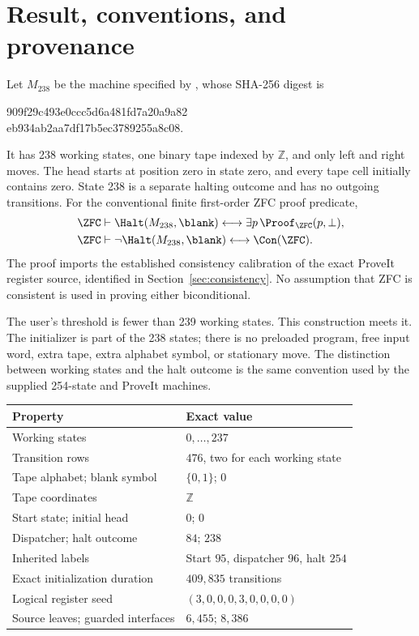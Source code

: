 \section{Result, conventions, and provenance}
\label{sec:result}

\begin{theorem}
\label{thm:main}
Let $M_{238}$ be the machine specified by
, whose SHA-256 digest is
\begin{center}\small\ttfamily
909f29c493e0ccc5d6a481fd7a20a9a82\\
eb934ab2aa7df17b5ec3789255a8c08.
\end{center}
It has 238 working states, one binary tape indexed by $\mathbb Z$, and
only left and right moves. The head starts at position zero in state zero,
and every tape cell initially contains zero. State 238 is a separate
halting outcome and has no outgoing transitions. For the conventional
finite first-order ZFC proof predicate,
\begin{align}
 \ZFC&\vdash
 \Halt(M_{238},\blank)\longleftrightarrow
 \exists p\,\Proof_{\ZFC}(p,\bot), \label{eq:mainhalt}\\
 \ZFC&\vdash
 \neg\Halt(M_{238},\blank)\longleftrightarrow\Con(\ZFC).
 \label{eq:maincon}
\end{align}
The proof imports the established consistency calibration of the exact
ProveIt register source, identified in Section~\ref{sec:consistency}.
No assumption that ZFC is consistent is used in proving either
biconditional.
\end{theorem}

The user's threshold is fewer than 239 working states. This construction
meets it. The initializer is part of the 238 states; there is no preloaded
program, free input word, extra tape, extra alphabet symbol, or stationary
move. The distinction between working states and the halt outcome is the
same convention used by the supplied 254-state and ProveIt machines.

\begin{center}
\begin{tabular}{@{}L{0.42\textwidth}L{0.48\textwidth}@{}}
\toprule
Property & Exact value\\
\midrule
Working states & $0,\ldots,237$\\
Transition rows & $476$, two for each working state\\
Tape alphabet; blank symbol & $\{0,1\}$; $0$\\
Tape coordinates & $\mathbb Z$\\
Start state; initial head & $0$; $0$\\
Dispatcher; halt outcome & $84$; $238$\\
Inherited labels & Start $95$, dispatcher $96$, halt $254$\\
Exact initialization duration & $409,835$ transitions\\
Logical register seed & $(3,0,0,0,3,0,0,0,0)$\\
Source leaves; guarded interfaces & $6,455$; $8,386$\\
\bottomrule
\end{tabular}
\end{center}

